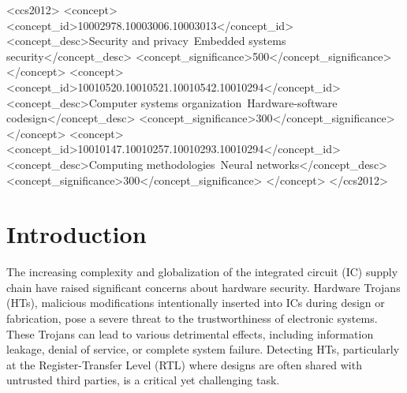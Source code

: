 \documentclass[sigplan,screen]{acmart}
\begin{document}
\begin{CCSXML}
<ccs2012>
   <concept>
       <concept_id>10002978.10003006.10003013</concept_id>
       <concept_desc>Security and privacy~Embedded systems security</concept_desc>
       <concept_significance>500</concept_significance>
       </concept>
   <concept>
       <concept_id>10010520.10010521.10010542.10010294</concept_id>
       <concept_desc>Computer systems organization~Hardware-software codesign</concept_desc>
       <concept_significance>300</concept_significance>
       </concept>
   <concept>
       <concept_id>10010147.10010257.10010293.10010294</concept_id>
       <concept_desc>Computing methodologies~Neural networks</concept_desc>
       <concept_significance>300</concept_significance>
       </concept>
 </ccs2012>
\end{CCSXML}





\maketitle

\section{Introduction}
The increasing complexity and globalization of the integrated circuit (IC) supply chain have raised significant concerns about hardware security. Hardware Trojans (HTs), malicious modifications intentionally inserted into ICs during design or fabrication, pose a severe threat to the trustworthiness of electronic systems. These Trojans can lead to various detrimental effects, including information leakage, denial of service, or complete system failure. Detecting HTs, particularly at the Register-Transfer Level (RTL) where designs are often shared with untrusted third parties, is a critical yet challenging task.
\end{document}
